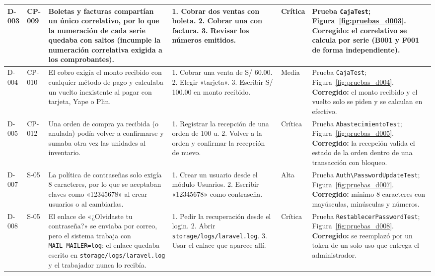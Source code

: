 \begin{landscape}
\begin{xltabular}{\linewidth}{|C{1.2cm}|C{1.2cm}|Y|Y|C{1.5cm}|L{4.8cm}|}
  D-003 & CP-009 & Boletas y facturas compartían un único correlativo, por lo que la numeración de cada serie quedaba con saltos (incumple la numeración correlativa exigida a los comprobantes). & 1. Cobrar dos ventas con boleta. 2. Cobrar una con factura. 3. Revisar los números emitidos. & Crítica & Prueba \texttt{CajaTest}; Figura~\ref{fig:pruebas_d003}. \newline \textbf{Corregido:} el correlativo se calcula por serie (B001 y F001 de forma independiente). \\ \hline

  D-004 & CP-010 & El cobro exigía el monto recibido con cualquier método de pago y calculaba un vuelto inexistente al pagar con tarjeta, Yape o Plin. & 1. Cobrar una venta de S/ 60.00. 2. Elegir «tarjeta». 3. Escribir S/ 100.00 en monto recibido. & Media & Prueba \texttt{CajaTest}; Figura~\ref{fig:pruebas_d004}. \newline \textbf{Corregido:} el monto recibido y el vuelto solo se piden y se calculan en efectivo. \\ \hline

  D-005 & CP-012 & Una orden de compra ya recibida (o anulada) podía volver a confirmarse y sumaba otra vez las unidades al inventario. & 1. Registrar la recepción de una orden de 100 u. 2. Volver a la orden y confirmar la recepción de nuevo. & Crítica & Prueba \texttt{AbastecimientoTest}; Figura~\ref{fig:pruebas_d005}. \newline \textbf{Corregido:} la recepción valida el estado de la orden dentro de una transacción con bloqueo. \\ \hline

  D-007 & S-05 & La política de contraseñas solo exigía 8 caracteres, por lo que se aceptaban claves como «12345678» al crear usuarios o al cambiarlas. & 1. Crear un usuario desde el módulo Usuarios. 2. Escribir «12345678» como contraseña. & Alta & Prueba \texttt{Auth\textbackslash PasswordUpdateTest}; Figura~\ref{fig:pruebas_d007}. \newline \textbf{Corregido:} mínimo 8 caracteres con mayúsculas, minúsculas y números. \\ \hline

  D-008 & S-05 & El enlace de «¿Olvidaste tu contraseña?» se enviaba por correo, pero el sistema trabaja con \texttt{MAIL\_MAILER=log}: el enlace quedaba escrito en \texttt{storage/logs/laravel.log} y el trabajador nunca lo recibía. & 1. Pedir la recuperación desde el login. 2. Abrir \texttt{storage/logs/laravel.log}. 3. Usar el enlace que aparece allí. & Crítica & Prueba \texttt{RestablecerPasswordTest}; Figura~\ref{fig:pruebas_d008}. \newline \textbf{Corregido:} se reemplazó por un token de un solo uso que entrega el administrador. \\
\end{xltabular}
\endgroup
\end{landscape}

